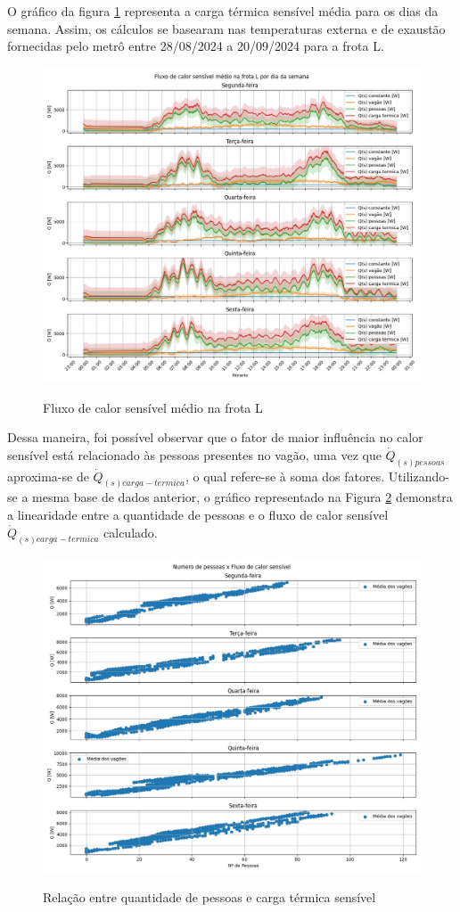 \documentclass[acronym,symbols,table]{fei}
\begin{document}
O gráfico da figura \ref{fig:Grafico_Carga_Termica} representa a carga térmica sensível média para os dias da semana. Assim, os cálculos se basearam nas temperaturas externa e de exaustão fornecidas pelo metrô entre 28/08/2024 a 20/09/2024 para a frota L.

\begin{figure}[!htb]
    \centering
    \caption{Fluxo de calor sensível médio na frota L}
    \includegraphics[width=0.8\linewidth]{Imagens/Grafico_Qs_Carga_Termica.jpeg}
    \label{fig:Grafico_Carga_Termica}
\end{figure}

Dessa maneira, foi possível observar que o fator de maior influência no calor sensível está relacionado às pessoas presentes no vagão, uma vez que $\dot{Q}_{(s)pessoas}$ aproxima-se de $\dot{Q}_{(s)carga-termica}$, o qual refere-se à soma dos fatores. Utilizando-se a mesma base de dados anterior, o gráfico representado na Figura \ref{fig:Grafico_PessoasxQs} demonstra a linearidade entre a quantidade de pessoas e o fluxo de calor sensível $\dot{Q}_{(s)carga-termica}$ calculado.

\begin{figure}[!htb]
    \centering
    \caption{Relação entre quantidade de pessoas e carga térmica sensível}
    \includegraphics[width=0.8\linewidth]{Imagens/Grafico_PessoasxQs.jpeg}
    \label{fig:Grafico_PessoasxQs}
\end{figure}
\end{document}
